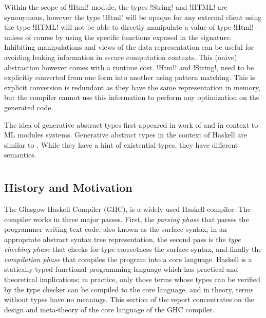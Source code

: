 \documentclass[screen,nonacm]{acmart}
\begin{document}
Within the scope of !Html! module, the types !String! and !HTML! are synonymous, however the type !Html! will be opaque for any external client using the type !HTML! will not be able to directly manipulate a value of type !Html!---unless of course by using the specific functions exposed in the signature. Inhibiting manipulations and views of the data representation can be useful for avoiding leaking information in secure computation contexts. This (naive) abstraction however comes with a runtime cost. !Html! and !String!, need to be explicitly converted from one form into another using pattern matching. This is explicit conversion is redundant as they have the same representation in memory, but the compiler cannot use this information to perform any optimization on the generated code.

The idea of generative abstract types first appeared in work of \citet{leroy_applicative_1995} and \citet{milner_definition_1997} in context to ML modules systems. Generative abstract types in the context of Haskell are similar to \cite{montagu_modeling_2009}. While they have a hint of existential types, they have different semantics.

\section{\SFC}\label{sec:sfc} %
\subsection{History and Motivation}
The Glasgow Haskell Compiler (GHC)\cite{ghc_2020}, is a widely used Haskell\cite{haskell_2010} compiler. The compiler works in three major passes. First, the \emph{parsing phase} that parses the programmer writing text code, also known as the surface syntax, in an appropriate abstract syntax tree representation, the second pass is the \emph{type checking phase} that checks for type correctness the surface syntax, and finally the \emph{compilation phase} that compiles the program into a core language. Haskell is a statically typed functional programming language which has practical and theoretical implications; in practice, only those terms whose types can be verified by the type checker can be compiled to the core language, and in theory, terms without types have no meanings. This section of the report concentrates on the design and meta-theory of the core language of the GHC compiler.
\end{document}
